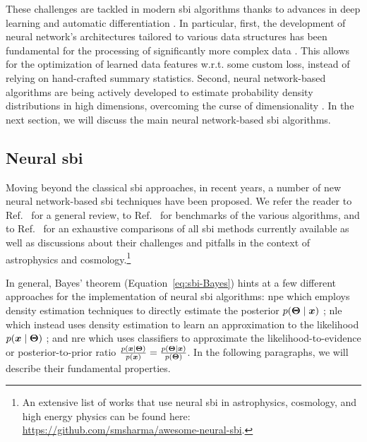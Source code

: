 These challenges are tackled in modern \gls*{sbi} algorithms thanks to advances in deep learning \cite{lecun2015deep} and automatic differentiation \cite{baydin2018automatic}. In particular, first, the development of neural network's architectures tailored to various data structures has been fundamental for the processing of significantly more complex data  \cite{lecun2015deep}. This allows for the optimization of learned data features w.r.t. some custom loss, instead of relying on hand-crafted summary statistics. Second, neural network-based algorithms are being actively developed to estimate probability density distributions in high dimensions, overcoming the curse of dimensionality \cite[\eg][]{papamakarios2019neural, papamakarios2021normalizing, Papamakarios:2016ctj}. In the next section, we will discuss the main neural network-based \gls*{sbi} algorithms. 


\subsection{Neural \gls*{sbi}} \label{subsec:nsbi}

Moving beyond the classical \gls*{sbi} approaches, in recent years, a number of new neural network-based \gls*{sbi} techniques have been proposed. We refer the reader to Ref.~\cite{Cranmer:2019eaq} for a general review, to Ref.~\cite{Lueckmann:2021aa} for benchmarks of the various algorithms, and to Ref.~\cite{Ho:2024whi} for an exhaustive comparisons of all \gls*{sbi} methods currently available as well as discussions about their challenges and pitfalls in the context of astrophysics and cosmology.\footnote{An extensive list of works that use neural \gls*{sbi} in astrophysics, cosmology, and high energy physics can be found here: \url{https://github.com/smsharma/awesome-neural-sbi}.} 

In general, Bayes' theorem (Equation~\eqref{eq:sbi-Bayes}) hints at a few different approaches for the implementation of neural \gls*{sbi} algorithms: \gls*{npe} which employs density estimation techniques to directly estimate the posterior $p(\bm{\Theta}\mid\bm{x})$ \cite{Papamakarios:2016ctj, Greenberg:2019aa}; \gls*{nle} which instead uses density estimation to learn an approximation to the likelihood $p(\bm{x}\mid\bm{\Theta})$ \cite{Papamakarios:2018aa, Durkan:2018aa}; and \gls*{nre} \cite{cranmer2015approximating, gutmann2018likelihood, Hermans:2019ioj, thomas2022likelihood, Miller:2020hua} which uses classifiers to approximate the likelihood-to-evidence or posterior-to-prior ratio $\frac{p(\bm{x}\mid\bm{\Theta})}{p(\bm{x})}=\frac{p(\bm{\Theta}\mid\bm{x})}{p(\bm{\Theta})}$. In the following paragraphs, we will describe their fundamental properties.


